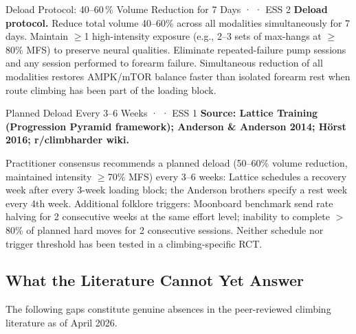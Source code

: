 \begin{bioplausbox}{Deload Protocol: 40--60\,\% Volume Reduction for 7 Days · \bioplausible · ESS 2}
\textbf{Deload protocol.} Reduce total volume 40–60\% across all modalities simultaneously for 7 days. Maintain $\geq$1 high-intensity exposure (e.g., 2–3 sets of max-hangs at $\geq$80\% MFS) to preserve neural qualities. Eliminate repeated-failure pump sessions and any session performed to forearm failure. Simultaneous reduction of all modalities restores AMPK/mTOR balance faster than isolated forearm rest when route climbing has been part of the loading block.
\end{bioplausbox}

\begin{folklorebox}{Planned Deload Every 3--6 Weeks · \folkloreverified · ESS 1}
\textbf{Source: Lattice Training (Progression Pyramid framework); Anderson \& Anderson 2014; Hörst 2016; r/climbharder wiki.}

Practitioner consensus recommends a planned deload (50–60\% volume reduction, maintained intensity $\geq$70\% MFS) every 3–6 weeks: Lattice schedules a recovery week after every 3-week loading block; the Anderson brothers specify a rest week every 4th week. Additional folklore triggers: Moonboard benchmark send rate halving for 2 consecutive weeks at the same effort level; inability to complete $>$80\% of planned hard moves for 2 consecutive sessions. Neither schedule nor trigger threshold has been tested in a climbing-specific RCT.
\end{folklorebox}

\subsection{What the Literature Cannot Yet Answer}
\label{subsec:open_questions}

The following gaps constitute genuine absences in the peer-reviewed climbing literature as of April 2026.

